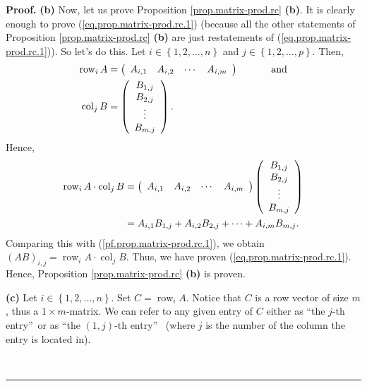 \documentclass[numbers=enddot,12pt,final,onecolumn,notitlepage]{scrartcl}%
\theoremstyle{definition}
\newenvironment{proof}[1][Proof]{\noindent\textbf{#1.} }{\ \rule{0.5em}{0.5em}}
\begin{document}
\begin{proof}
\textbf{(b)} Now, let us prove Proposition \ref{prop.matrix-prod.rc}
\textbf{(b)}. It is clearly enough to prove (\ref{eq.prop.matrix-prod.rc.1})
(because all the other statements of Proposition \ref{prop.matrix-prod.rc}
\textbf{(b)} are just restatements of (\ref{eq.prop.matrix-prod.rc.1})). So
let's do this. Let $i\in\left\{  1,2,\ldots,n\right\}  $ and $j\in\left\{
1,2,\ldots,p\right\}  $. Then,%
\begin{align}
\operatorname*{row}\nolimits_{i}A  &  =\left(
\begin{array}
[c]{cccc}%
A_{i,1} & A_{i,2} & \cdots & A_{i,m}%
\end{array}
\right)  \ \ \ \ \ \ \ \ \ \ \text{and}\label{pf.prop.matrix-prod.rc.row}\\
\operatorname*{col}\nolimits_{j}B  &  =\left(
\begin{array}
[c]{c}%
B_{1,j}\\
B_{2,j}\\
\vdots\\
B_{m,j}%
\end{array}
\right)  . \label{pf.prop.matrix-prod.rc.col}%
\end{align}
Hence,%
\begin{align*}
\operatorname*{row}\nolimits_{i}A\cdot\operatorname*{col}\nolimits_{j}B  &
=\left(
\begin{array}
[c]{cccc}%
A_{i,1} & A_{i,2} & \cdots & A_{i,m}%
\end{array}
\right)  \left(
\begin{array}
[c]{c}%
B_{1,j}\\
B_{2,j}\\
\vdots\\
B_{m,j}%
\end{array}
\right) \\
&  =A_{i,1}B_{1,j}+A_{i,2}B_{2,j}+\cdots+A_{i,m}B_{m,j}.
\end{align*}
Comparing this with (\ref{pf.prop.matrix-prod.rc.1}), we obtain $\left(
AB\right)  _{i,j}=\operatorname*{row}\nolimits_{i}A\cdot\operatorname*{col}%
\nolimits_{j}B$. Thus, we have proven (\ref{eq.prop.matrix-prod.rc.1}). Hence,
Proposition \ref{prop.matrix-prod.rc} \textbf{(b)} is proven.

\textbf{(c)} Let $i\in\left\{  1,2,\ldots,n\right\}  $. Set
$C=\operatorname*{row}\nolimits_{i}A$. Notice that $C$ is a row vector of size
$m$, thus a $1\times m$-matrix. We can refer to any given entry of $C$ either
as \textquotedblleft the $j$-th entry\textquotedblright\ or as
\textquotedblleft the $\left(  1,j\right)  $-th entry\textquotedblright%
\ (where $j$ is the number of the column the entry is located in).


\end{proof}
\end{document}
